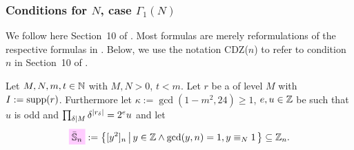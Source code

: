 \documentclass{article}
\begin{document}
\subsubsection{Conditions for $N$, case $\Gamma_1(N)$}

We follow here Section~10 of
\cite{ChenDuZhao_FindingModularFunctionsRamanujan_2019}.
%
Most formulas are merely reformulations of the respective formulas in
\cite{ChenDuZhao_FindingModularFunctionsRamanujan_2019}.
%
Below, we use the notation CDZ($n$) to refer to condition $n$ in
Section~10 of \cite{ChenDuZhao_FindingModularFunctionsRamanujan_2019}.

\begin{Definition}
  \cite[Sect.~10]{ChenDuZhao_FindingModularFunctionsRamanujan_2019}
  \label{def:condition-co-eta-quotient-gamma1}

  Let $M, N, m, t \in \mathbb{N}$ with $M,N>0$, $t<m$.
  Let $r$ be a  of
  level $M$ with $I := \operatorname{supp}(r)$.
  Furthermore let $\kappa :=\gcd(1-m^2, 24)\ge1$,
  $e, u\in\mathbb{Z}$ be such that $u$ is odd and
  $\prod_{\delta \mid M} \delta^{\lvert r_\delta\rvert}=2^e u$ and let
  \begin{gather*}
    \defineNotation[Sbar-n]{\bar{\setS}_{n}}
    :=
    \SetDef{[y^2]_n}{y \in \setZ \land \gcd(y, n)=1, y\equiv_N 1}
    \subseteq
    \setZ_n.
  \end{gather*}


\end{Definition}
\end{document}

